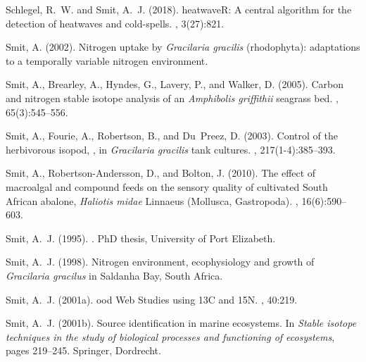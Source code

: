 \begin{thebibliography}{}
  Schlegel, R.~W. and Smit, A.~J. (2018).
  \newblock heatwave{R}: A central algorithm for the detection of heatwaves and
    cold-spells.
  , 3(27):821.
  
  Smit, A. (2002).
  \newblock Nitrogen uptake by \emph{Gracilaria gracilis} (rhodophyta):
    adaptations to a temporally variable nitrogen environment.
  
  Smit, A., Brearley, A., Hyndes, G., Lavery, P., and Walker, D. (2005).
  \newblock Carbon and nitrogen stable isotope analysis of an \emph{Amphibolis
    griffithii} seagrass bed.
  , 65(3):545--556.
  
  Smit, A., Fourie, A., Robertson, B., and Du~Preez, D. (2003).
  \newblock Control of the herbivorous isopod, , in
    \emph{Gracilaria gracilis} tank cultures.
  , 217(1-4):385--393.
  
  Smit, A., Robertson-Andersson, D., and Bolton, J. (2010).
  \newblock The effect of macroalgal and compound feeds on the sensory quality of
    cultivated {S}outh {A}frican abalone, \emph{Haliotis midae} {L}innaeus
    ({M}ollusca, {G}astropoda).
  , 16(6):590--603.
  
  Smit, A.~J. (1995).
  .
  \newblock PhD thesis, University of Port Elizabeth.
  
  Smit, A.~J. (1998).
  \newblock Nitrogen environment, ecophysiology and growth of \emph{Gracilaria
    gracilus} in {S}aldanha {B}ay, {S}outh {A}frica.
  
  Smit, A.~J. (2001a).
  ood {W}eb {S}tudies using 13{C} and 15{N}.
  , 40:219.
  
  Smit, A.~J. (2001b).
  \newblock Source identification in marine ecosystems.
  \newblock In {\em Stable isotope techniques in the study of biological
    processes and functioning of ecosystems}, pages 219--245. Springer,
    Dordrecht.
  

\end{thebibliography}
